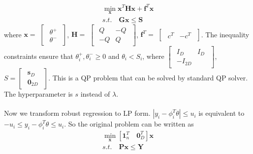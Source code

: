 \documentclass[a4paper]{article}
\begin{document}
\begin{equation}
  \begin{aligned}
  \min_{\bm{x}} \bm{x}^T \bm{H} \bm{x}+\bm{f}^T \bm{x}\\
  s.t. \quad \bm{G}\bm{x}\leq \bm{S}
  \end{aligned}
\end{equation}
where $\bm{x}=$ $\begin{bmatrix} \begin{smallmatrix} \theta^+ \\ \theta^- \end{smallmatrix} \end{bmatrix}$, $\bm{H}=$ $\begin{bmatrix} \begin{smallmatrix} Q & -Q \\ -Q & Q \end{smallmatrix} \end{bmatrix}$, $\bm{f}^T=$ $\begin{bmatrix} \begin{smallmatrix} c^T & -c^T \end{smallmatrix} \end{bmatrix}$. The inequality constraints ensure that $\theta^+_i,\theta^-_i \geq 0$ and $\theta_i<S_i$, where
$\begin{bmatrix} \begin{smallmatrix} I_D & I_D \\ -I_{2D}\end{smallmatrix} \end{bmatrix}$, $S= \begin{bmatrix} \begin{smallmatrix} \bm{s}_D \\ \bm{0}_{2D}\end{smallmatrix}\end{bmatrix}$. This is a QP problem that can be solved by standard QP solver. The hyperparameter is $s$ instead of $\lambda$.\\
\\
Now we transform robust regression to LP form. $|y_i-\phi^T_i\theta |\leq u_i$ is equivalent to $-u_i\leq y_i-\phi^T_i\theta \leq u_i$. So the original problem can be written as
\begin{equation}
  \begin{aligned}
    \min_{\bm{x}} [\bm{1}_n^T \quad \bm{0}_D^T]\bm{x}\\
    s.t. \quad \bm{P}\bm{x}\leq \bm{Y}
  \end{aligned}
\end{equation}
\end{document}
